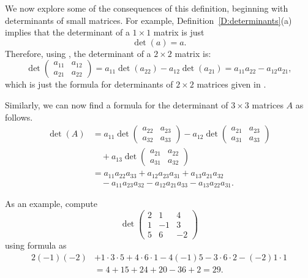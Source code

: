 \documentclass{ximera}
\begin{document}
We now explore some of the consequences of this definition, beginning 
with determinants of small matrices.  For example, 
Definition~\ref{D:determinants}(a) implies that the determinant of a 
$1\times 1$ matrix is just
\[
\det(a) = a.
\]
Therefore, using , the determinant of a $2\times
2$ matrix is:
\[
\det\left(\begin{array}{cc} a_{11} & a_{12}\\a_{21} & a_{22}
\end{array}\right) = a_{11}\det(a_{22}) - a_{12}\det(a_{21}) =
a_{11}a_{22} - a_{12}a_{21},
\]
which is just the formula for determinants of $2\times 2$
matrices given in . 
 
Similarly, we can now find a formula for the determinant of
$3\times 3$ matrices $A$ as follows.
\begin{align}
\det(A) & = a_{11}
\det \left(\begin{array}{cc} a_{22} & a_{23}\\a_{32} & a_{33}
\end{array}\right) 
- a_{12}
\det \left(\begin{array}{cc} a_{21} & a_{23}\\a_{31} & a_{33}
           \end{array}\right)  \nonumber\\
  &\quad + a_{13}
\det\left(\begin{array}{cc} a_{21} & a_{22}\\a_{31} & a_{32}
\end{array}\right)  \nonumber\\
        & = a_{11}a_{22}a_{33} + a_{12}a_{23}a_{31} + a_{13}a_{21}a_{32}  \nonumber\\
  &\quad - a_{11}a_{23}a_{32} - a_{12}a_{21}a_{33} - a_{13}a_{22}a_{31}. \label{e:det3}
\end{align}  

As an example, compute
\[
\det\left(\begin{array}{rrr} 2 & 1 & 4\\ 1 & -1 & 3\\ 5 & 6 & -2
\end{array}\right) 
\]
using formula  as
\begin{align*}
2(-1)(-2) & + 1\cdot3\cdot5 + 4\cdot6\cdot1 -4(-1)5 -3\cdot6\cdot2
            - (-2)1\cdot1 \\
  &= 4+15+24+20 -36 +2 = 29. 
\end{align*}
\end{document}
